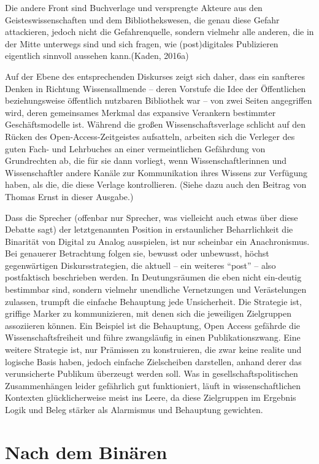 \documentclass[a4paper,
fontsize=11pt,
oneside,
numbers=noperiodatend,
parskip=half-,
bibliography=totoc,
final
]{scrartcl}
\begin{document}
Die andere Front sind Buchverlage und versprengte Akteure aus den
Geisteswissenschaften und dem Bibliothekswesen, die genau diese Gefahr
attackieren, jedoch nicht die Gefahrenquelle, sondern vielmehr alle
anderen, die in der Mitte unterwegs sind und sich fragen, wie
(post)digitales Publizieren eigentlich sinnvoll aussehen kann.(Kaden,
2016a)

Auf der Ebene des entsprechenden Diskurses zeigt sich daher, dass ein
sanfteres Denken in Richtung Wissensallmende -- deren Vorstufe die Idee
der Öffentlichen beziehungsweise öffentlich nutzbaren Bibliothek war --
von zwei Seiten angegriffen wird, deren gemeinsames Merkmal das
expansive Verankern bestimmter Geschäftsmodelle ist. Während die großen
Wissenschaftsverlage schlicht auf den Rücken des Open-Access-Zeitgeistes
aufsatteln, arbeiten sich die Verleger des guten Fach- und Lehrbuches an
einer vermeintlichen Gefährdung von Grundrechten ab, die für sie dann
vorliegt, wenn Wissenschaftlerinnen und Wissenschaftler andere Kanäle
zur Kommunikation ihres Wissens zur Verfügung haben, als die, die diese
Verlage kontrollieren. (Siehe dazu auch den Beitrag von Thomas Ernst in
dieser Ausgabe.)

Dass die Sprecher (offenbar nur Sprecher, was vielleicht auch etwas über
diese Debatte sagt) der letztgenannten Position in erstaunlicher
Beharrlichkeit die Binarität von Digital zu Analog ausspielen, ist nur
scheinbar ein Anachronismus. Bei genauerer Betrachtung folgen sie,
bewusst oder unbewusst, höchst gegenwärtigen Diskursstrategien, die
aktuell -- ein weiteres \enquote{post} -- also postfaktisch beschrieben
werden. In Deutungsräumen die eben nicht ein-deutig bestimmbar sind,
sondern vielmehr unendliche Vernetzungen und Verästelungen zulassen,
trumpft die einfache Behauptung jede Unsicherheit. Die Strategie ist,
griffige Marker zu kommunizieren, mit denen sich die jeweiligen
Zielgruppen assoziieren können. Ein Beispiel ist die Behauptung, Open
Access gefährde die Wissenschaftsfreiheit und führe zwangsläufig in
einen Publikationszwang. Eine weitere Strategie ist, nur Prämissen zu
konstruieren, die zwar keine realite und logische Basis haben, jedoch
einfache Zielscheiben darstellen, anhand derer das verunsicherte
Publikum überzeugt werden soll. Was in gesellschaftspolitischen
Zusammenhängen leider gefährlich gut funktioniert, läuft in
wissenschaftlichen Kontexten glücklicherweise meist ins Leere, da diese
Zielgruppen im Ergebnis Logik und Beleg stärker als Alarmismus und
Behauptung gewichten.

\section*{Nach dem Binären}\label{nach-dem-binuxe4ren}
\end{document}

